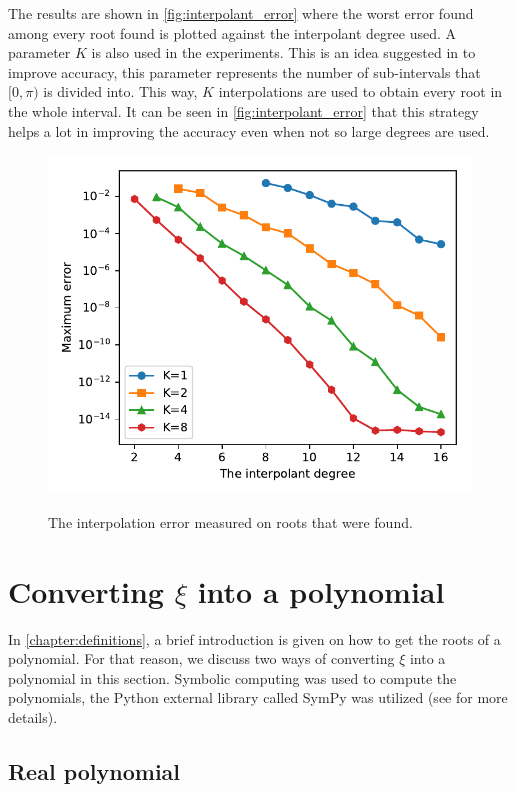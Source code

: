 The results are shown in \autoref{fig:interpolant_error} where the worst error found among every root found is plotted against the interpolant degree used. A parameter $K$ is also used in the experiments. This is an idea suggested in  to improve accuracy, this parameter represents the number of sub-intervals that $[0, \pi)$ is divided into. This way, $K$ interpolations are used to obtain every root in the whole interval. It can be seen in \autoref{fig:interpolant_error} that this strategy helps a lot in improving the accuracy even when not so large degrees are used.

\begin{figure}
	\centering
	\caption{The interpolation error measured on roots that were found.}
	\includegraphics{tex/figures/interpolant_error}
	\fautor
	\label{fig:interpolant_error}
\end{figure}

\section{Converting $\xi$ into a polynomial}

In \autoref{chapter:definitions}, a brief introduction is given on how to get the roots of a polynomial. For that reason, we discuss two ways of converting $\xi$ into a polynomial in this section. Symbolic computing was used to compute the polynomials, the Python external library called SymPy was utilized (see  for more details).

\subsection{Real polynomial}

